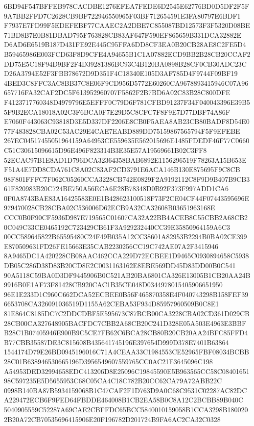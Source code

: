 \documentclass[UTF8,fontset=fandol,zihao=-4,a4paper]{ctexart}
\begin{document}
{{6BD94F547BFFEB978CACDBE1276EFEA7FEDE6D2545E62776BD0D5DF2F5F9A7BB2FFD7C2628CB9BF722946550965F03BF712654591E3FA80797E6BDF1
F7937E7FD99F5EDEFEBF77CAAEC2A2DBE7C855087BD12573F3F5320D08BE71BD8B7E0B81DBAD795F763828CB83AF647F590EF865659B331DCA32882E
D6AD6E6519B187D431FE92E445C95FFA6DD8CF3EA0B20CB28AE8C2FE5D4B59465986E003FCD63F8D9CFE4A94655B1C1A07882ECD9BB2B28CB20CCAF2
DD75E5C18F94D9BF2F4D39281386BC93C4B120BA0898B28CF0CB30ADC23CD26A3794E52F3FBB78672D9D351F4C18340E105D3AF785D4F9744F09BF19
4BED3C8FFC3AC8BB37C8E06F9CD956D5772E60260CA9678893415946C07A96657716FA32CAF2DC5F613952960707F5862F2B7BD6A02C83B28C800DFE
F4123717760348D4979796E5EFFF0C79D6F781CFBD91237F34F040043396E39B55F9B2ECA18018A02C3F6BCA0F7E29D5C8CFC7F8F9E7D77DBF74A86F
E7060F443063C93818D3E5D337DF2206E8CB0F5AEA8AB23CB80BADF8D54E077F483828CBA02C53AC29E4CAE7EABD889DD75159867565794F5F9EFEBE
267EC04517455051964159A64953CE559635E562015696E1485FDEDF46F77C0660C51C30615096615D96E496F823314B3E35E57A19569661B02C3FF8
52ECAC97B1E8AD1D796DCA32364358BAB6892E1156296519F78263A15B653EF51A4E7DD8CDA761C8A02C83AF2CD3791E6ACA146B130E875695F9C8CB
98F801FFFC7F062C05260CCA3228CB742E0829F2A9192112C8F9D9B407B9CB361F820983B20C724BE750A56ECA6E28B78348D0B92F373F997ADD1CA6
0F0A8743BAE83A16425583E0E1B428623100518F73F2CE04CF44F07443595696E979470028CB28CBA02C536006D62ECB9A32CA32608B03651963168E
CCC0B0F90CF5936D987E719565C01607CA32A22BB4ACEB8C55CBB2A68CB20C049C33CE0465192C723429CB61F3A929232440CC39E35850964159A6C3
00CC589645822B65595480C24F49B035A12CC38601A82953B2294B0BA02CE399E870509631FD26FE15663E35CAB2230256CC19C742AE07A2F3415946
8A9465DC1A420228CB08AAC462CCA229D72ECBEE1D9465C0930894658C5938DB05C286D38D83B20CD8E2C0031163162E8EBE569DD45D83DD00B0C541
90A5118C59BA0D3DF9445906B0C521AB20BA6801CA326E13005B1CB20AA24B9916B0E1AF73F81428CB920CAC1B35CE048D0344978015405906651950
96E1E233D1C960C662DCA52ECBEE0B56F465870358E4F040743298B158FEF396653708CA326091036519D1155A62CEBA53F934D85957960509B0C8E1
81E864C8185DC7C2DDCDBF5E595673C87BCB00CA3228CBA02CD361D029CB28CB00CA327648905BACFDC7CBB2A68CB20C241D328E05A503E4963E3BBF
B28C1B07405946E900B9C5CE7FB62C6BCA28CB80B20CB20AA24BFC85FFD4B77CBB35587DE3C815608B435641745196E397654D999D378E7401B63864
1544174D79E26BD0945196016C71A4CEAA33C1984553CE52965FBF08034BCBB28C01B638946530665196D3956549607559765CC0AC21E3645096C198
A54953DED32994658EDC413206D8E25096C19845590E5B963565CC58C0840165198C597235E5D5655953C68C05CA4C18C782B20CC62CA79A72ABB22C
0998B140BA87B5934159068B1C47CAF2F1D763D9A0C68C9531C02287AC82DCA229472ECB6F9FED64FBDDE464008B1CB2EA58B0C8A12C2BCBB89B040C
5040905559C52287A69CAE2CBFFDC65BCC5840010159058B1CCA3298B1800202B20A72CB70535696415906E20F196782D201724B9FA6AC2CA32C0328
}}
\end{document}
